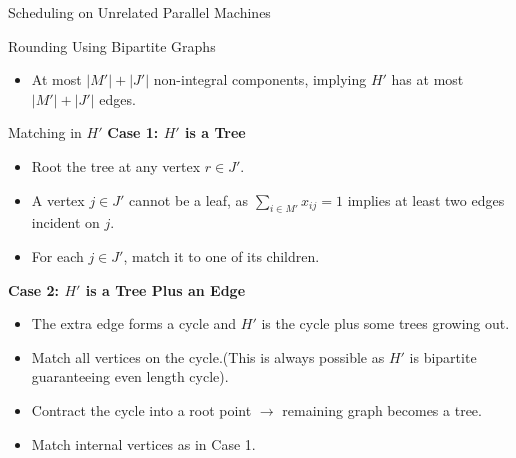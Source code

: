 \documentclass[xcolor=svgnames]{beamer}
\begin{document}
\begin{section}{Scheduling on Unrelated Parallel Machines}
\begin{frame}{Rounding Using Bipartite Graphs}
\begin{itemize}[<+->]
        \item At most $|M'| + |J'|$ non-integral components, implying $H'$ has at most $ |M'| + |J'|$ edges.
    \end{itemize}
\end{frame}
\begin{frame}{Matching in $H'$}
    \textbf{Case 1: $H'$ is a Tree}
    \begin{itemize}
        \item Root the tree at any vertex $r \in J'$.
        \item A vertex $j \in J'$ cannot be a leaf, as $\sum_{i \in M'} x_{ij} = 1$ implies at least two edges incident on $j$.
        \item For each $j \in J'$, match it to one of its children.
    \end{itemize}
    \pause
    \textbf{Case 2: $H'$ is a Tree Plus an Edge}
    \begin{itemize}
        \item The extra edge forms a cycle and $H'$ is the cycle plus some trees growing out.
        \item Match all vertices on the cycle.(This is always possible as $H'$ is bipartite guaranteeing even length cycle).
        \item Contract the cycle into a root point $\rightarrow$ remaining graph becomes a tree.
        \item Match internal vertices as in Case 1.
    \end{itemize}
    
\end{frame}



\end{section}
\end{document}
